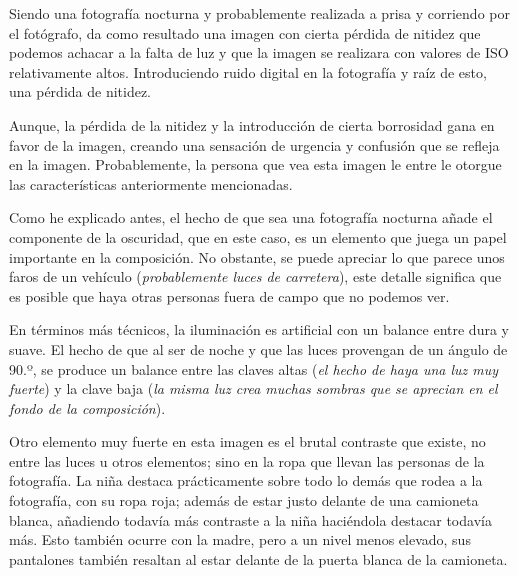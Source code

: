 \documentclass[11pt]{article}
\begin{document}
Siendo una fotografía nocturna y probablemente realizada a prisa y corriendo por el fotógrafo, da como resultado una imagen con cierta pérdida de nitidez que podemos achacar a la falta de luz y que la imagen se realizara con valores de ISO relativamente altos. Introduciendo ruido digital en la fotografía y raíz de esto, una pérdida de nitidez. \newline

Aunque, la pérdida de la nitidez y la introducción de cierta borrosidad gana en favor de la imagen, creando una sensación de urgencia y confusión que se refleja en la imagen. Probablemente, la persona que vea esta imagen le entre le otorgue las características anteriormente mencionadas.  \newline

Como he explicado antes, el hecho de que sea una fotografía nocturna añade el componente de la oscuridad, que en este caso, es un elemento que juega un papel importante en la composición. No obstante, se puede apreciar lo que parece unos faros de un vehículo (\textit{probablemente luces de carretera}), este detalle significa que es posible que haya otras personas fuera de campo que no podemos ver. \newline

En términos más técnicos, la iluminación es artificial con un balance entre dura y suave. El hecho de que al ser de noche y que las luces provengan de un ángulo de 90.º, se produce un balance entre las claves altas (\textit{el hecho de haya una luz muy fuerte}) y la clave baja (\textit{la misma luz crea muchas sombras que se aprecian en el fondo de la composición}). \newline

Otro elemento muy fuerte en esta imagen es el brutal contraste que existe, no entre las luces u otros elementos; sino en la ropa que llevan las personas de la fotografía. La niña destaca prácticamente sobre todo lo demás que rodea a la fotografía, con su ropa roja; además de estar justo delante de una camioneta blanca, añadiendo todavía más contraste a la niña haciéndola destacar todavía más. Esto también ocurre con la madre, pero a un nivel menos elevado, sus pantalones también resaltan al estar delante de la puerta blanca de la camioneta. \newline

\newpage
\end{document}

